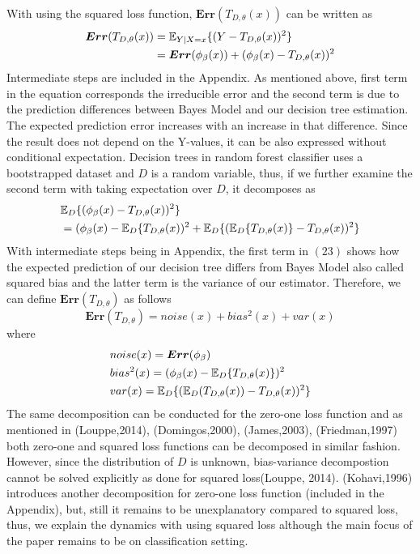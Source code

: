 With using the squared loss function, $\boldsymbol{Err}(T_{D,\theta}(x))$ can be written as
\begin{align}
\boldsymbol{Err}(T_{D, \theta}(x)) & = \mathbb{E}_{Y|X=x}\{(Y-T_{D,\theta}(x))^2\} \notag \\
							   	  & = \boldsymbol{Err}(\phi_{\beta}(x)) + (\phi_{\beta}(x)-T_{D,\theta}(x))^2
\end{align}
Intermediate steps are included in the Appendix. As mentioned above, first term in the equation corresponds the irreducible error and the second term is due to the prediction differences between Bayes Model and our decision tree estimation. The expected prediction error increases with an increase in that difference. Since the result does not depend on the Y-values, it can be also expressed without conditional expectation. Decision trees in random forest classifier uses a bootstrapped dataset and $D$ is a random variable, thus, if we further examine the second term with taking expectation over $D$, it decomposes as
\begin{align}
& \mathbb{E}_{D}\{(\phi_{\beta}(x) - T_{D,\theta}(x))^2 \} \notag \\
&= (\phi_{\beta}(x) - \mathbb{E}_{D}\{T_{D,\theta}(x))^2 + \mathbb{E}_{D}\{(\mathbb{E}_{D}\{T_{D,\theta}(x)\} - T_{D,\theta}(x))^2\}
\end{align}
With intermediate steps being in Appendix, the first term in $(23)$ shows how the expected prediction of our decision tree differs from Bayes Model also called squared bias and the latter term is the variance of our estimator. Therefore, we can define $\boldsymbol{Err}(T_{D,\theta})$ as follows
\begin{equation}
\boldsymbol{Err}(T_{D,\theta}) = noise(x) + bias^2(x) + var(x)
\end{equation}
where
\begin{align}
& noise(x) = \boldsymbol{Err}(\phi_{\beta}) \notag \\
& bias^2(x) = (\phi_{\beta}(x) - \mathbb{E}_{D}\{T_{D,\theta}(x)\})^2 \notag \\
& var(x) = \mathbb{E}_{D}\{(\mathbb{E}_{D}(T_{D,\theta}(x)) - T_{D,\theta}(x))^2\} \notag
\end{align}
The same decomposition can be conducted for the zero-one loss function and as mentioned in (Louppe,2014), (Domingos,2000), (James,2003), (Friedman,1997) both zero-one and squared loss functions can be decomposed in similar fashion. However, since the distribution of $D$ is unknown, bias-variance decompostion cannot be solved explicitly as done for squared loss(Louppe, 2014). (Kohavi,1996) introduces another decomposition for zero-one loss function (included in the Appendix), but, still it remains to be unexplanatory compared to squared loss, thus, we explain the dynamics with using squared loss although the main focus of the paper remains to be on classification setting.

